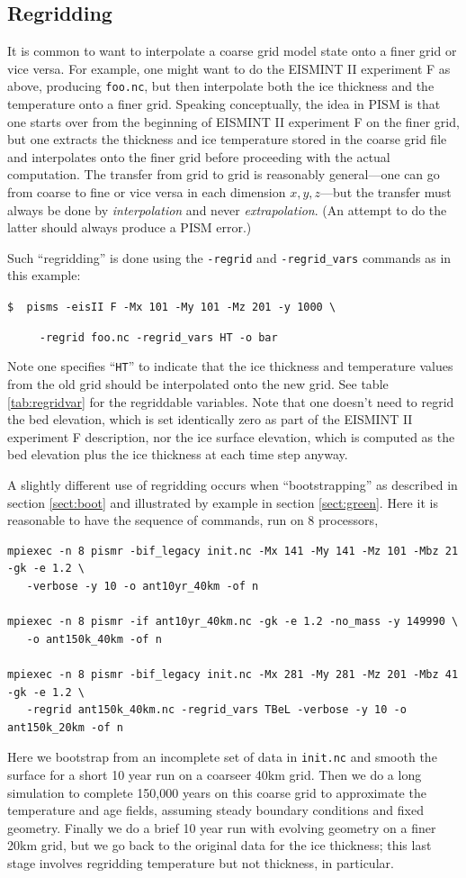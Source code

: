 \documentclass[11pt,final]{amsart}
\begin{document}
\subsection{Regridding}  It is common to want to interpolate a coarse grid model state onto a finer grid or vice versa.  For example, one might want to do the EISMINT II experiment F as above, producing \verb|foo.nc|, but then interpolate both the ice thickness and the temperature onto a finer grid.  Speaking conceptually, the idea in PISM is that one starts over from the beginning of EISMINT II experiment F on the finer grid, but one extracts the thickness and ice temperature stored in the coarse grid file and interpolates onto the finer grid before proceeding with the actual computation.  The transfer from grid to grid is reasonably general---one can go from coarse to fine or vice versa in each dimension $x,y,z$---but the transfer must always be done by \emph{interpolation} and never \emph{extrapolation}.  (An attempt to do the latter should always produce a PISM error.)

Such ``regridding'' is done using the \verb|-regrid| and \verb|-regrid_vars| commands as in this example:

\verb|$  pisms -eisII F -Mx 101 -My 101 -Mz 201 -y 1000 \|

\verb|     -regrid foo.nc -regrid_vars HT -o bar|

\noindent Note one specifies ``\verb|HT|'' to indicate that the ice thickness and temperature values from the old grid should be interpolated onto the new grid.  See table \ref{tab:regridvar} for the regriddable variables.  Note that one doesn't need to regrid the bed elevation, which is set identically zero as part of the EISMINT II experiment F description, nor the ice surface elevation, which is computed as the bed elevation plus the ice thickness at each time step anyway.

A slightly different use of regridding occurs when ``bootstrapping'' as described in section \ref{sect:boot} and illustrated by example in section \ref{sect:green}.  Here it is reasonable to have the sequence of commands, run on 8 processors,
\small
\begin{verbatim}
mpiexec -n 8 pismr -bif_legacy init.nc -Mx 141 -My 141 -Mz 101 -Mbz 21 -gk -e 1.2 \
   -verbose -y 10 -o ant10yr_40km -of n

mpiexec -n 8 pismr -if ant10yr_40km.nc -gk -e 1.2 -no_mass -y 149990 \
   -o ant150k_40km -of n

mpiexec -n 8 pismr -bif_legacy init.nc -Mx 281 -My 281 -Mz 201 -Mbz 41 -gk -e 1.2 \
   -regrid ant150k_40km.nc -regrid_vars TBeL -verbose -y 10 -o ant150k_20km -of n
\end{verbatim}
\normalsize
Here we bootstrap from an incomplete set of data in \verb|init.nc| and smooth the surface for a short 10 year run on a coarseer 40km grid.  Then we do a long simulation to complete 150,000 years on this coarse grid to approximate the temperature and age fields, assuming steady boundary conditions and fixed geometry.  Finally we do a brief 10 year run with evolving geometry on a finer 20km grid, but we go back to the original data for the ice thickness; this last stage involves regridding temperature but not thickness, in particular.
\end{document}
